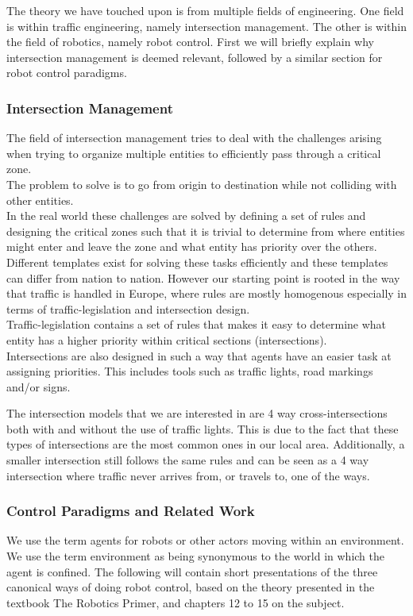 The theory we have touched upon is from multiple fields of engineering. One field is within traffic engineering, namely intersection management. The other is within the field of robotics, namely robot control.
First we will briefly explain why intersection management is deemed relevant, followed by a similar section for robot control paradigms.

\subsubsection{Intersection Management}
The field of intersection management tries to deal with the challenges arising when trying to organize multiple entities to efficiently pass through a critical zone.\\
The problem to solve is to go from origin to destination while not colliding with other entities.\\

In the real world these challenges are solved by defining a set of rules and designing the critical zones such that it is trivial to determine from where entities might enter and leave the zone and what entity has priority over the others.\\

Different templates exist for solving these tasks efficiently and these templates can differ from nation to nation.
However our starting point is rooted in the way that traffic is handled in Europe, where rules are mostly homogenous especially in terms of traffic-legislation and intersection design.\\
Traffic-legislation contains a set of rules that makes it easy to determine what entity has a higher priority within critical sections (intersections).\\
Intersections are also designed in such a way that agents have an easier task at assigning priorities. 
This includes tools such as traffic lights, road markings and/or signs.

The intersection models that we are interested in are 4 way cross-intersections both with and without the use of traffic lights.
This is due to the fact that these types of intersections are the most common ones in our local area. Additionally, a smaller intersection still follows the same rules and can be seen as a 4 way intersection where traffic never arrives from, or travels to, one of the ways.

\subsubsection{Control Paradigms and Related Work}
We use the term agents for robots or other actors moving within an environment.\\
We use the term environment as being synonymous to the world in which the agent is confined.
The following will contain short presentations of the three canonical ways of doing robot control, based on the theory presented in the textbook The Robotics Primer\citep{book:mataric}, and chapters 12 to 15 on the subject.\\

